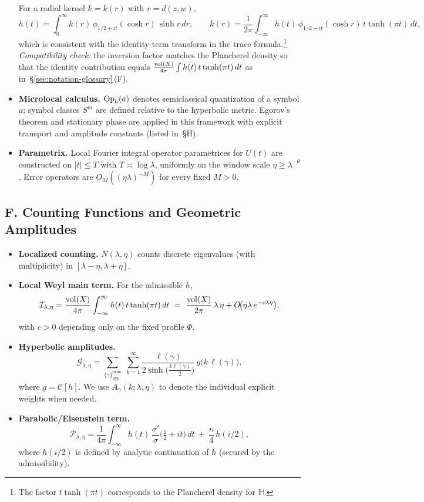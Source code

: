 \begin{itemize}
        For a radial kernel $k=k(r)$ with $r=d(z,w)$,
        \[
          h(t)=\int_0^\infty k(r)\,\phi_{1/2+it}(\cosh r)\,\sinh r\,dr,
          \qquad
          k(r)=\frac{1}{2\pi}\int_{-\infty}^{\infty} h(t)\,\phi_{1/2+it}(\cosh r)\,t\tanh(\pi t)\,dt,
        \]
        which is consistent with the identity-term transform in the trace formula.\footnote{The factor $t\tanh(\pi t)$ corresponds to the Plancherel density for $\mathbb{H}$.}
        \emph{Compatibility check:} the inversion factor matches the Plancherel density so that the identity contribution equals
        $\frac{\operatorname{vol}(X)}{4\pi}\int h(t)\,t\tanh(\pi t)\,dt$ as in~\S\ref{sec:notation-glossary}\,(F).
  \item \textbf{Microlocal calculus.} $\operatorname{Op}_h(a)$ denotes semiclassical quantization of a symbol $a$; symbol classes $S^m$ are defined relative to the hyperbolic metric.
        Egorov’s theorem and stationary phase are applied in this framework with explicit transport and amplitude constants (listed in~\S H).
  \item \textbf{Parametrix.} Local Fourier integral operator parametrices for $U(t)$ are constructed on $|t|\le T$ with $T\asymp\log\lambda$, uniformly on the window scale $\eta\ge\lambda^{-\theta}$.
        Error operators are $O_M((\eta\lambda)^{-M})$ for every fixed $M>0$.
\end{itemize}

\subsection*{F. Counting Functions and Geometric Amplitudes}

\begin{itemize}
  \item \textbf{Localized counting.} $N(\lambda,\eta)$ counts discrete eigenvalues (with multiplicity) in $[\lambda-\eta,\lambda+\eta]$.
  \item \textbf{Local Weyl main term.} For the admissible $h$,
        \[
           \mathcal{I}_{\lambda,\eta}=\frac{\operatorname{vol}(X)}{4\pi}\int_{-\infty}^{\infty} h(t)\,t\tanh(\pi t)\,dt
           \ =\ \frac{\operatorname{vol}(X)}{2\pi}\,\lambda\,\eta + O\!\big(\eta\lambda\,e^{-c\lambda\eta}\big),
        \]
        with $c>0$ depending only on the fixed profile $\Phi$.
  \item \textbf{Hyperbolic amplitudes.}
        \[
           \mathcal{G}_{\lambda,\eta}=\sum_{\{\gamma\}^{\mathrm{prim}}_{\mathrm{hyp}}}\;\sum_{k=1}^{\infty}
           \frac{\ell(\gamma)}{2\sinh\!\big(\tfrac{k\ell(\gamma)}{2}\big)}\,g\!\big(k\,\ell(\gamma)\big),
        \]
        where $g=\mathcal{C}[h]$. We use $A_\gamma(k;\lambda,\eta)$ to denote the individual explicit weights when needed.
  \item \textbf{Parabolic/Eisenstein term.}
        \[
           \mathcal{P}_{\lambda,\eta}=\frac{1}{4\pi}\int_{-\infty}^{\infty} h(t)\,\frac{\sigma'}{\sigma}\!\Big(\tfrac12+it\Big)\,dt
           \ +\ \frac{\kappa}{4}\,h(i/2),
        \]
        where $h(i/2)$ is defined by analytic continuation of $h$ (secured by the admissibility).
\end{itemize}

